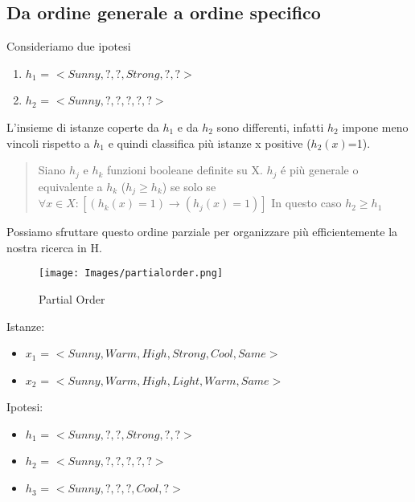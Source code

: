 \documentclass{article}
\begin{document}
\subsection{Da ordine generale a ordine specifico}
Consideriamo due ipotesi
\begin{enumerate}
    \item $h_1$ = $<Sunny,?,?,Strong,?,?>$
    \item $h_2$ = $<Sunny,?,?,?,?,?>$
\end{enumerate}
L'insieme di istanze coperte da $h_1$ e da $h_2$ sono differenti, infatti $h_2$ impone meno vincoli rispetto a $h_1$ e quindi classifica più istanze x positive ($h_2(x)$=1).
\begin{quote}
    Siano $h_j$ e $h_k$ funzioni booleane definite su X. $h_j$ é più generale o equivalente a $h_k$ ($h_j \geq h_k$) se solo se $\forall x \in X : [(h_k(x)=1) \rightarrow (h_j(x)=1)]$ \newline
    In questo caso $h_2 \geq h_1$
\end{quote}
Possiamo sfruttare questo ordine parziale per organizzare più efficientemente la nostra ricerca in H.
\begin{figure}[H]
    \centering
    \texttt{[image: Images/partialorder.png]}
    \caption{Partial Order}
\end{figure}
Istanze:
\begin{itemize}
    \item $x_1$ = $<Sunny,Warm,High,Strong,Cool,Same>$
    \item $x_2$ = $<Sunny,Warm,High,Light,Warm,Same>$
\end{itemize}
Ipotesi:
\begin{itemize}
    \item $h_1$ = $<Sunny,?,?,Strong,?,?>$
    \item $h_2$ = $<Sunny,?,?,?,?,?>$
    \item $h_3$ = $<Sunny,?,?,?,Cool,?>$
\end{itemize}
\end{document}
